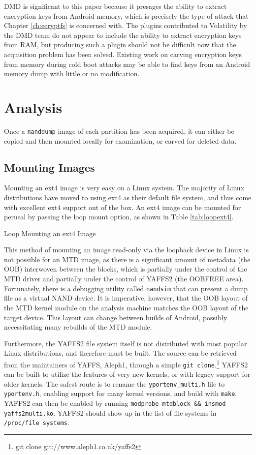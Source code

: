 DMD is significant to this paper because it presages the ability to extract encryption keys from Android memory, which is precisely
the type of attack that Chapter \ref{ch:ecryptfs} is concerned with. The plugins contributed to Volatility by the DMD team do not
appear to include the ability to extract encryption keys from RAM, but producing such a plugin should not be difficult now that the
acquisition problem has been solved. Existing work \cite{coldboot} on carving encryption keys from memory during cold boot attacks
may be able to find keys from an Android memory dump with little or no modification.

\section{Analysis}

Once a \texttt{nanddump} image of each partition has been acquired, it can either be copied and then mounted locally for
examination, or carved for deleted data.  

\subsection{Mounting Images}
Mounting an ext4 image is very easy on a Linux system. The majority of Linux distributions
have moved to using ext4 as their default file system, and thus come with excellent ext4 support out of the box. An ext4 image can
be mounted for perusal by passing the loop mount option, as shown in Table \ref{tab:loopext4}.  
\begin{table}[htb]
\lstset{numbers=none}

\caption{Loop Mounting an ext4 Image}
\label{tab:loopext4}
\end{table}

This method of mounting an image read-only via the loopback device in Linux is not possible for an MTD image, as there is a
significant amount of metadata (the OOB) interwoven between the blocks, which is partially under the control of the MTD driver and
partially under the control of YAFFS2 (the OOBFREE area).  Fortunately, there is a debugging utility called \texttt{nandsim} that
can present a dump file as a virtual NAND device. It is imperative, however, that the OOB layout of the MTD kernel module on the
analysis machine matches the OOB layout of the target device.  This layout can change between builds of Android, possibly
necessitating many rebuilds of the MTD module. 

Furthermore, the YAFFS2 file system itself is not distributed with most popular Linux distributions, and therefore must be built.
The source can be retrieved from the maintainers of YAFFS, Aleph1, through a simple \texttt{git clone}.\footnote{git clone
git://www.aleph1.co.uk/yaffs2} YAFFS2 can be built to utilize the features of very new kernels, or with legacy support for older
kernels.  The safest route is to rename the \texttt{yportenv\_multi.h} file to \texttt{yportenv.h}, enabling support for many kernel
versions, and build with \texttt{make}.  YAFFS2 can then be enabled by running \texttt{modprobe mtdblock \&\& insmod
yaffs2multi.ko}.  YAFFS2 should show up in the list of file systems in \texttt{/proc/file systems}.

